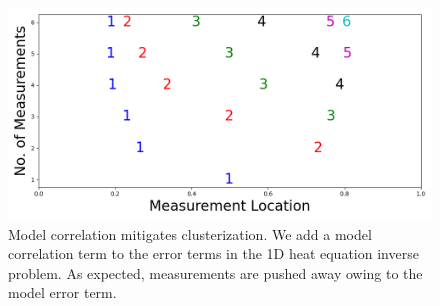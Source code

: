 \begin{figure}
    \centering
    \includegraphics[height=0.5\textwidth]{figs/dst_modelError4.png}
    \caption{Model correlation mitigates clusterization. We add a
      model correlation term to the error terms in the 1D heat
      equation inverse problem. As expected, measurements are pushed
      away owing to the model error term.}
  \label{fig:corr_errors}
\end{figure}



